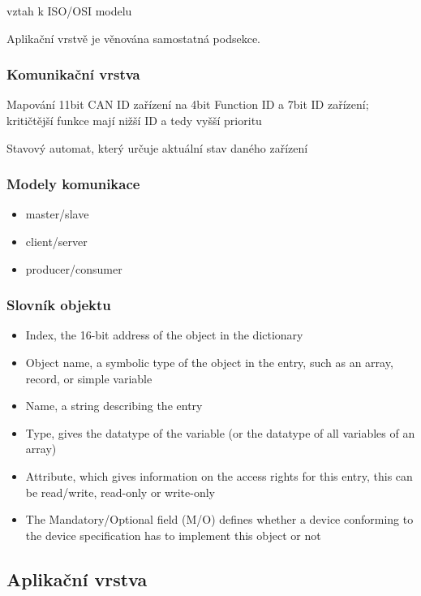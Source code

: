 \documentclass[
  field=ainfk,
  biblatex,
  glossaries,
  index
]{kidiplom}
\begin{document}
vztah k ISO/OSI modelu

Aplikační vrstvě je věnována samostatná podsekce.

\subsubsection{Komunikační vrstva}

Mapování 11bit CAN ID zařízení na 4bit Function ID a 7bit ID zařízení; kritičtější funkce mají nižší ID a tedy vyšší prioritu

Stavový automat, který určuje aktuální stav daného zařízení

\subsubsection{Modely komunikace}

\begin{itemize}
    \item master/slave
    \item client/server
    \item producer/consumer
\end{itemize}

\subsubsection{Slovník objektu}
\begin{itemize}
    \item Index, the 16-bit address of the object in the dictionary
    \item Object name, a symbolic type of the object in the entry, such as an array, record, or simple variable
    \item Name, a string describing the entry
    \item Type, gives the datatype of the variable (or the datatype of all variables of an array)
    \item Attribute, which gives information on the access rights for this entry, this can be read/write, read-only or write-only
    \item The Mandatory/Optional field (M/O) defines whether a device conforming to the device specification has to implement this object or not 
\end{itemize}

\subsection{Aplikační vrstva}
\end{document}
